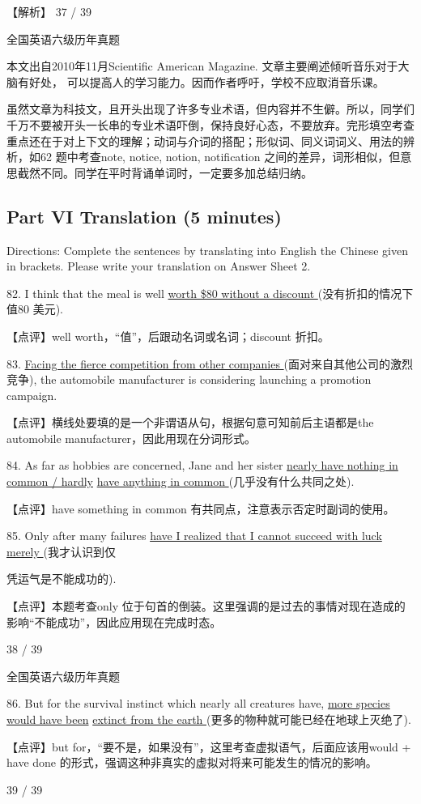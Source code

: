 \documentclass[UTF8,11pt]{ctexart}
\begin{document}
【解析】 37 / 39


全国英语六级历年真题


本文出自2010年11月Scientific American Magazine. 文章主要阐述倾听音乐对于大脑有好处， 可以提高人的学习能力。因而作者呼吁，学校不应取消音乐课。


虽然文章为科技文，且开头出现了许多专业术语，但内容并不生僻。所以，同学们千万不要被开头一长串的专业术语吓倒，保持良好心态，不要放弃。完形填空考查重点还在于对上下文的理解；动词与介词的搭配；形似词、同义词词义、用法的辨析，如62 题中考查note, notice, notion, notification 之间的差异，词形相似，但意思截然不同。同学在平时背诵单词时，一定要多加总结归纳。


\subsection*{\textbf{Part VI} \textbf{Translation} \textbf{(5 minutes)}}


Directions: Complete the sentences by translating into English the Chinese given in brackets. Please write your translation on Answer Sheet 2.


82. I think that the meal is well \uline{worth \$80 without a discount }(没有折扣的情况下值80 美元).


【点评】well worth，“值”，后跟动名词或名词；discount 折扣。


83. \uline{Facing the fierce competition from other companies }(面对来自其他公司的激烈竞争), the automobile manufacturer is considering launching a promotion campaign.


【点评】横线处要填的是一个非谓语从句，根据句意可知前后主语都是the automobile manufacturer，因此用现在分词形式。


84. As far as hobbies are concerned, Jane and her sister \uline{nearly have nothing in common / hardly} \uline{have anything in common }(几乎没有什么共同之处).


【点评】have something in common 有共同点，注意表示否定时副词的使用。


85. Only after many failures \uline{have I realized that I cannot succeed with luck merely }(我才认识到仅


凭运气是不能成功的).


【点评】本题考查only 位于句首的倒装。这里强调的是过去的事情对现在造成的影响“不能成功”，因此应用现在完成时态。


38 / 39


全国英语六级历年真题


86. But for the survival instinct which nearly all creatures have, \uline{more species would have been} \uline{extinct from the earth }(更多的物种就可能已经在地球上灭绝了).


【点评】but for，“要不是，如果没有”，这里考查虚拟语气，后面应该用would + have done 的形式，强调这种非真实的虚拟对将来可能发生的情况的影响。


39 / 39
\end{document}
